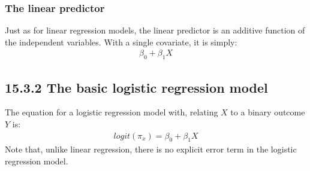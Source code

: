 \documentclass[letterpaper,10pt,english]{jupyterBook}
\begin{document}
\subsubsection{The linear predictor}
\label{\detokenize{15.d. Logistic Regression:the-linear-predictor}}
\sphinxAtStartPar
Just as for linear regression models, the linear predictor is an additive function of the independent variables. With a single covariate, it is simply:
\begin{equation*}
\begin{split}
\beta_0 + \beta_1 X
\end{split}
\end{equation*}

\subsection{15.3.2 The basic logistic regression model}
\label{\detokenize{15.d. Logistic Regression:the-basic-logistic-regression-model}}
\sphinxAtStartPar
The equation for a logistic regression model with, relating \(X\) to a binary outcome \(Y\) is:
\begin{equation*}
\begin{split}
logit(\pi_x) = \beta_0 + \beta_1 X
\end{split}
\end{equation*}
\sphinxAtStartPar
Note that, unlike linear regression, there is no explicit error term in the logistic regression model.
\end{document}
